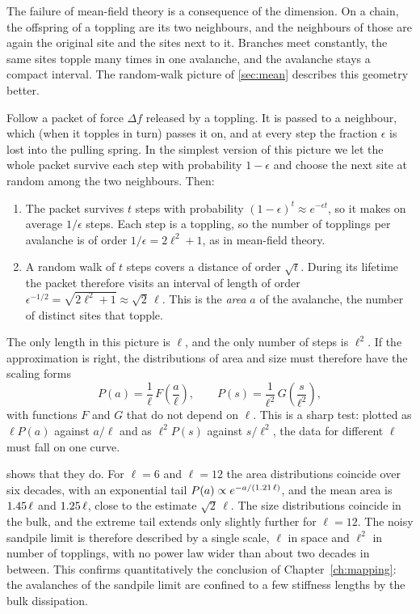 The failure of mean-field theory is a consequence of the dimension. On a chain, the offspring of a toppling are its two neighbours, and the
neighbours of those are again the original site and the sites next to it. Branches meet constantly, the same sites topple many times in one
avalanche, and the avalanche stays a compact interval. The random-walk picture of \cref{sec:mean} describes this geometry better.

Follow a packet of force $\Delta f$ released by a toppling. It is passed to a neighbour, which (when it topples in turn) passes it on, and at every
step the fraction $\epsilon$ is lost into the pulling spring. In the simplest version of this picture we let the whole packet survive each step with
probability $1-\epsilon$ and choose the next site at random among the two neighbours. Then:
\begin{enumerate}
  \item The packet survives $t$ steps with probability $(1-\epsilon)^t\approx e^{-\epsilon t}$, so it makes on average $1/\epsilon$ steps. Each
    step is a toppling, so the number of topplings per avalanche is of order $1/\epsilon = 2\ell^2+1$, as in mean-field theory.
  \item A random walk of $t$ steps covers a distance of order $\sqrt t$. During its lifetime the packet therefore visits an interval of length of
    order $\epsilon^{-1/2} = \sqrt{2\ell^2+1}\approx\sqrt2\,\ell$. This is the \emph{area} $a$ of the avalanche, the number of distinct sites
    that topple.
\end{enumerate}
The only length in this picture is $\ell$, and the only number of steps is $\ell^2$. If the approximation is right, the distributions of area and
size must therefore have the scaling forms
\begin{equation}
  P(a) = \frac1\ell\,F\!\left(\frac a\ell\right),\qquad P(s) = \frac1{\ell^2}\,G\!\left(\frac s{\ell^2}\right),
  \label{eq:rw-scaling}
\end{equation}
with functions $F$ and $G$ that do not depend on $\ell$. This is a sharp test: plotted as $\ell P(a)$ against $a/\ell$ and as $\ell^2P(s)$ against $s/\ell^2$,
the data for different $\ell$ must fall on one curve.

 shows that they do. For $\ell = 6$ and $\ell = 12$ the area distributions coincide over six decades, with an exponential tail
$P(a)\propto e^{-a/(1.21\,\ell)}$, and the mean area is $1.45\,\ell$ and $1.25\,\ell$, close to the estimate $\sqrt2\,\ell$. The size
distributions coincide in the bulk, and the extreme tail extends only slightly further for $\ell=12$. The noisy sandpile limit is therefore
described by a single scale, $\ell$ in space and $\ell^2$ in number of topplings, with no power law wider than about two decades in between. This
confirms quantitatively the conclusion of Chapter~\ref{ch:mapping}: the avalanches of the sandpile limit are confined to a few stiffness lengths by the
bulk dissipation.


